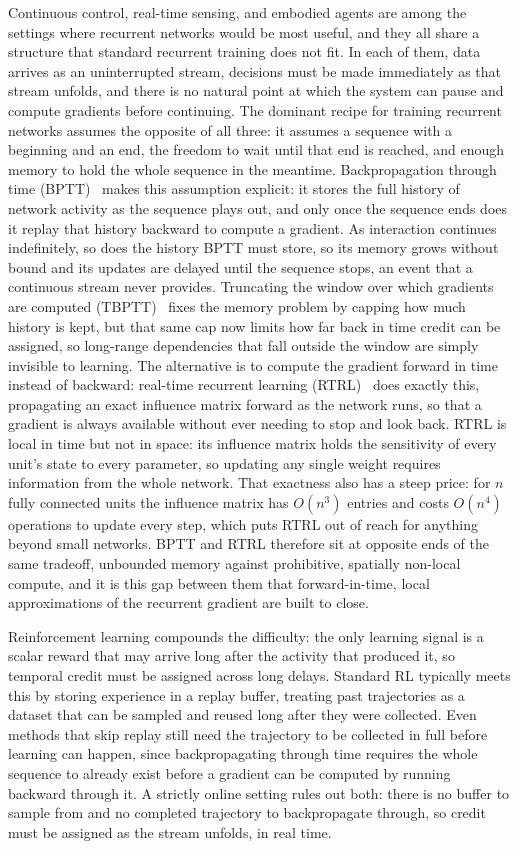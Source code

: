 \documentclass[10pt,twocolumn]{article}
\begin{document}
Continuous control, real-time sensing, and embodied agents are among the
settings where recurrent networks would be most useful, and they all share a
structure that standard recurrent training does not fit. In each of them,
data arrives as an uninterrupted stream, decisions must be made immediately
as that stream unfolds, and there is no natural point at which the system can
pause and compute gradients before continuing. The dominant recipe for
training recurrent networks assumes the opposite of all three: it assumes a
sequence with a beginning and an end, the freedom to wait until that end is
reached, and enough memory to hold the whole sequence in the meantime. Backpropagation through time (BPTT)~\citep{Werbos1990BackpropagationTT}
makes this assumption explicit: it stores the full history of network activity
as the sequence plays out, and only once the sequence ends does it replay that
history backward to compute a gradient. As interaction continues indefinitely,
so does the history BPTT must store, so its memory grows without bound and its
updates are delayed until the sequence stops, an event that a continuous
stream never provides. Truncating the window over which gradients are
computed (TBPTT)~\citep{WilliamsZipser1995} fixes the memory problem by
capping how much history is kept, but that same cap now limits how far back
in time credit can be assigned, so long-range dependencies that fall outside
the window are simply invisible to learning. The alternative is to compute the
gradient forward in time instead of backward: real-time recurrent learning
(RTRL)~\citep{RTRL} does exactly this, propagating an exact influence matrix
forward as the network runs, so that a gradient is always available without
ever needing to stop and look back. RTRL is local in time but not in space:
its influence matrix holds the sensitivity of every unit's state to every
parameter, so updating any single weight requires information from the whole
network. That exactness also has a steep price: for $n$ fully connected units
the influence matrix has $O(n^3)$ entries and costs $O(n^4)$ operations to
update every step, which puts RTRL out of reach for anything beyond small
networks. BPTT and RTRL therefore sit at opposite ends of the same tradeoff,
unbounded memory against prohibitive, spatially non-local compute, and it is this gap
between them that forward-in-time, local approximations of the recurrent
gradient are built to close.

Reinforcement learning compounds the difficulty: the only learning signal is a
scalar reward that may arrive long after the activity that produced it, so
temporal credit must be assigned across long delays. Standard RL typically
meets this by storing experience in a replay buffer, treating past
trajectories as a dataset that can be sampled and reused long after they were
collected. Even methods that skip replay still need the trajectory to be
collected in full before learning can happen, since backpropagating through
time requires the whole sequence to already exist before a gradient can be
computed by running backward through it. A strictly online setting rules out
both: there is no buffer to sample from and no completed trajectory to
backpropagate through, so credit must be assigned as the stream unfolds, in
real time.
\end{document}
